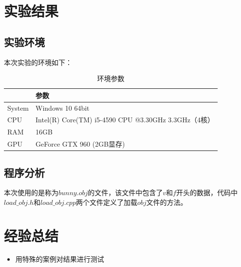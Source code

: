 \documentclass[10pt]{article}
\begin{document}
\section{实验结果}
\subsection{实验环境}
本次实验的环境如下：
\begin{table}[H]
\caption{环境参数}
\begin{center}
\begin{tabular}{ll}
\toprule  %
& 参数\\
\midrule  %
System& Windows 10 64bit \\
CPU& Intel(R) Core(TM) i5-4590 CPU @3.30GHz 3.3GHz（4核）\\
RAM& 16GB\\
GPU& GeForce GTX 960 (2GB显存)\\
\bottomrule %
\end{tabular}
\end{center}
\end{table}
\subsection{程序分析}
本次使用的是称为$bunny.obj$的文件，该文件中包含了$v$和$f$开头的数据，代码中$load\_obj.h$和$load\_obj.cpp$两个文件定义了加载$obj$文件的方法。

\section{经验总结}
\begin{itemize}
\item{用特殊的案例对结果进行测试}
\end{itemize}
\end{document}
